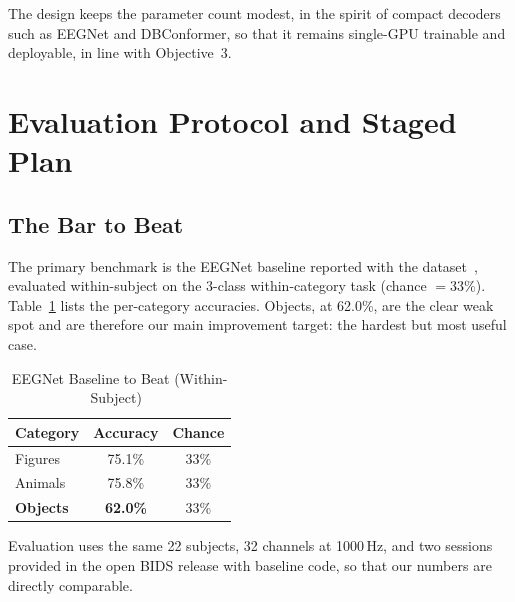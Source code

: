 \documentclass[conference]{IEEEtran}
\begin{document}
The design keeps the parameter count modest, in the spirit of compact
decoders such as EEGNet and DBConformer, so that it remains single-GPU
trainable and deployable, in line with Objective~3.

\section{Evaluation Protocol and Staged Plan}

\subsection{The Bar to Beat}
The primary benchmark is the EEGNet baseline reported with the
dataset~\cite{gao2026}, evaluated within-subject on the 3-class
within-category task (chance $=33\%$). Table~\ref{tab:baseline} lists the
per-category accuracies. Objects, at 62.0\%, are the clear weak spot and are
therefore our main improvement target: the hardest but most useful case.

\begin{table}[t]
  \caption{EEGNet Baseline to Beat (Within-Subject)~\cite{gao2026}}
  \label{tab:baseline}
  \centering
  \renewcommand{\arraystretch}{1.25}
  \begin{tabular}{@{}lcc@{}}
    \toprule
    \textbf{Category} & \textbf{Accuracy} & \textbf{Chance} \\
    \midrule
    Figures & 75.1\% & 33\% \\
    Animals & 75.8\% & 33\% \\
    \textbf{Objects} & \textbf{62.0\%} & 33\% \\
    \bottomrule
  \end{tabular}
\end{table}

Evaluation uses the same 22 subjects, 32 channels at 1000\,Hz, and two
sessions provided in the open BIDS release with baseline code, so that our
numbers are directly comparable.
\end{document}
